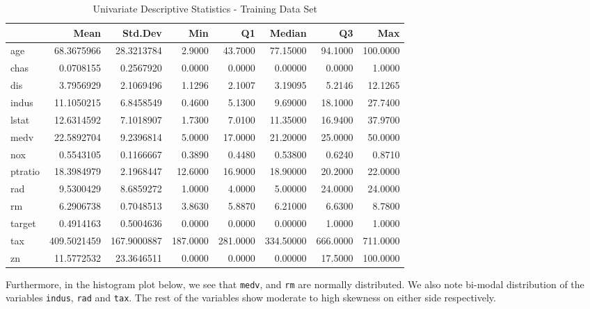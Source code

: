 \documentclass[3p]{elsarticle} %
\begin{document}
\begin{table}

\caption{\label{tab:unnamed-chunk-2}Univariate Descriptive Statistics - Training Data Set}
\centering
\begin{tabular}[t]{l|r|r|r|r|r|r|r}
\hline
  & Mean & Std.Dev & Min & Q1 & Median & Q3 & Max\\
\hline
age & 68.3675966 & 28.3213784 & 2.9000 & 43.7000 & 77.15000 & 94.1000 & 100.0000\\
\hline
chas & 0.0708155 & 0.2567920 & 0.0000 & 0.0000 & 0.00000 & 0.0000 & 1.0000\\
\hline
dis & 3.7956929 & 2.1069496 & 1.1296 & 2.1007 & 3.19095 & 5.2146 & 12.1265\\
\hline
indus & 11.1050215 & 6.8458549 & 0.4600 & 5.1300 & 9.69000 & 18.1000 & 27.7400\\
\hline
lstat & 12.6314592 & 7.1018907 & 1.7300 & 7.0100 & 11.35000 & 16.9400 & 37.9700\\
\hline
medv & 22.5892704 & 9.2396814 & 5.0000 & 17.0000 & 21.20000 & 25.0000 & 50.0000\\
\hline
nox & 0.5543105 & 0.1166667 & 0.3890 & 0.4480 & 0.53800 & 0.6240 & 0.8710\\
\hline
ptratio & 18.3984979 & 2.1968447 & 12.6000 & 16.9000 & 18.90000 & 20.2000 & 22.0000\\
\hline
rad & 9.5300429 & 8.6859272 & 1.0000 & 4.0000 & 5.00000 & 24.0000 & 24.0000\\
\hline
rm & 6.2906738 & 0.7048513 & 3.8630 & 5.8870 & 6.21000 & 6.6300 & 8.7800\\
\hline
target & 0.4914163 & 0.5004636 & 0.0000 & 0.0000 & 0.00000 & 1.0000 & 1.0000\\
\hline
tax & 409.5021459 & 167.9000887 & 187.0000 & 281.0000 & 334.50000 & 666.0000 & 711.0000\\
\hline
zn & 11.5772532 & 23.3646511 & 0.0000 & 0.0000 & 0.00000 & 17.5000 & 100.0000\\
\hline
\end{tabular}
\end{table}

Furthermore, in the histogram plot below, we see that \texttt{medv}, and
\texttt{rm} are normally distributed. We also note bi-modal distribution
of the variables \texttt{indus}, \texttt{rad} and \texttt{tax}. The rest
of the variables show moderate to high skewness on either side
respectively.
\end{document}
